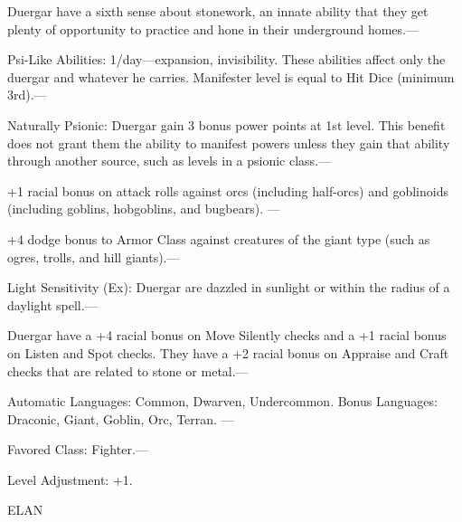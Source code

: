 \documentclass{article}
\begin{document}
Duergar have a sixth sense about stonework, an innate ability that they get plenty 
of opportunity to practice and hone in their underground homes.---

Psi-Like Abilities: 1/day---expansion, invisibility. These abilities affect only 
the duergar and whatever he carries. Manifester level is equal to Hit Dice (minimum 
3rd).---

Naturally Psionic: Duergar gain 3 bonus power points at 1st level. This benefit 
does not grant them the ability to manifest powers unless they gain that ability 
through another source, such as levels in a psionic class.--- 

\parindent=3pt
+1 racial bonus on attack rolls against orcs (including half-orcs) and goblinoids 
(including goblins, hobgoblins, and bugbears). --- 

+4 dodge bonus to Armor Class against creatures of the giant type (such as ogres, 
trolls, and hill giants).---

Light Sensitivity (Ex): Duergar are dazzled in sunlight or within the radius of 
a daylight spell.---

Duergar have a +4 racial bonus on Move Silently checks and a +1 racial bonus on 
Listen and Spot checks. They have a +2 racial bonus on Appraise and Craft checks 
that are related to stone or metal.---

Automatic Languages: Common, Dwarven, Undercommon. Bonus Languages: Draconic, Giant, 
Goblin, Orc, Terran. ---

Favored Class: Fighter.---

Level Adjustment: +1.

\vspace{12pt}
\parindent=0pt
{\LARGE{}ELAN}
\end{document}
